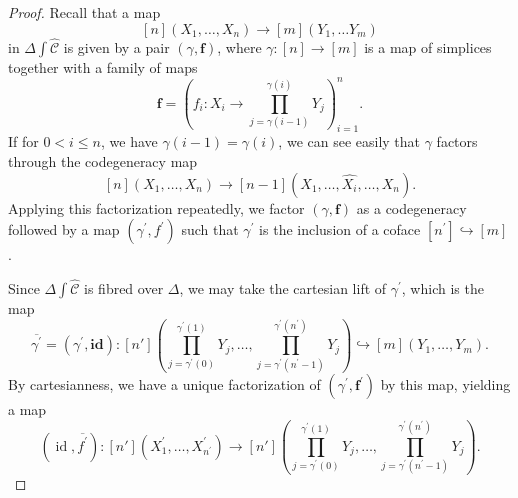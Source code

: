 \documentclass[leqno]{article}
\numberwithin{equation}{subsection}
\theoremstyle{plain}   %
\theoremstyle{remark}
\theoremstyle{plain}
\DeclareMathOperator{\id}{id}
\newcommand{\psh}[1]{\ensuremath{\widehat{#1}}}
\renewcommand{\C}{\ensuremath{\mathcal{C}}}
\begin{document}
\begin{proof}
	Recall that a map \[[n](X_1,\dots, X_n) \to [m](Y_1,\dots Y_m)\] in \(\Delta \int \psh{\C}\) is given by a pair \((\gamma,	\mathbf{f})\), where \(\gamma:[n]\to [m]\) is a map of simplices together with a family of maps \[\mathbf{f}=\left(f_i: 	X_i \to \prod_{j=\gamma(i-1)}^{\gamma(i)}Y_j\right)_{i=1}^n.\]
	If for \(0<i\leq n\), we have \(\gamma(i-1)=\gamma(i)\), we can see easily that \(\gamma\) factors through the 	codegeneracy map \[[n](X_1,\dots,X_n)\to [n-1](X_1,\dots,\psh{X_i},\dots,X_n).\]  Applying this factorization repeatedly, 	we factor \((\gamma,\mathbf{f})\) as a codegeneracy followed by a map \((\gamma^\prime,f^\prime)\) such that \(\gamma^\prime\) is the inclusion of a coface \([n^\prime]\hookrightarrow [m]\).

	Since \(\Delta\int \psh{\C}\) is fibred over \(\Delta\), we may take the cartesian lift of \(\gamma^\prime\), which is 	the map \[\overline{\gamma^\prime}=(\gamma^\prime,\mathbf{id}):[n']\left(\prod_{j=\gamma^\prime(0)}^{\gamma^\prime(1)}Y_j,	 \dots, \prod_{j=\gamma^\prime(n^\prime-1)}^{\gamma^\prime(n^\prime)} Y_j \right)\hookrightarrow [m](Y_1,\dots,Y_m).\]  	By cartesianness, we have a unique factorization of \((\gamma^\prime,\mathbf{f^\prime})\) by this map, yielding a map \[	(\id,\overline{f^\prime}):[n'](X^\prime_1,\dots,X^\prime_{n^\prime})\to [n']\left(\prod_{j=\gamma^\prime(0)}^	{\gamma^\prime(1)}Y_j, \dots, \prod_{j=\gamma^\prime(n^\prime-1)}^{\gamma^\prime(n^\prime)} Y_j \right).\]


\end{proof}
\end{document}
